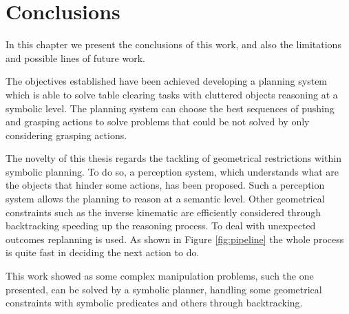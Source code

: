 \chapter{Conclusions}
\label{ch:conclusions}

In this chapter we present the conclusions of this work, and also the limitations and possible lines of future work.

The objectives established have been achieved developing a planning system which is able to solve table clearing tasks with cluttered objects reasoning at a symbolic level. The planning system can choose the best sequences of pushing and grasping actions to solve problems that could be not solved by only considering grasping actions.

The novelty of this thesis regards the tackling of geometrical restrictions within symbolic planning. To do so, a perception system, which understands what are the objects that hinder some actions, has been proposed. Such a perception system allows the planning to reason at a semantic level. Other geometrical constraints such as the inverse kinematic are efficiently considered through backtracking speeding up the reasoning process. To deal with unexpected outcomes replanning is used. As shown in Figure \ref{fig:pipeline} the whole process is quite fast in deciding the next action to do. 

This work showed as some complex manipulation problems, such the one presented, can be solved by a symbolic planner, handling some geometrical constraints with symbolic predicates and others through backtracking.


